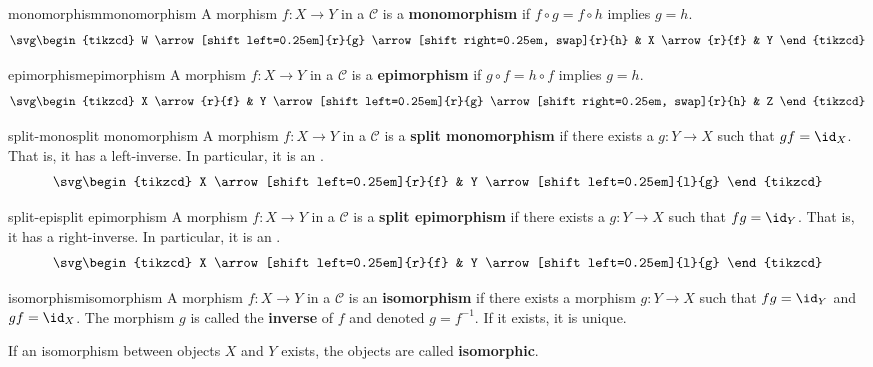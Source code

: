 \begin{topic}{monomorphism}{monomorphism}
    A morphism $f : X \to Y$ in a  $\mathcal{C}$ is a \textbf{monomorphism} if $f \circ g = f \circ h$ implies $g = h$.
    \[ \svg \begin{tikzcd} W \arrow[shift left=0.25em]{r}{g} \arrow[shift right=0.25em, swap]{r}{h} & X \arrow{r}{f} & Y \end{tikzcd} \]
\end{topic}

\begin{topic}{epimorphism}{epimorphism}
    A morphism $f : X \to Y$ in a  $\mathcal{C}$ is a \textbf{epimorphism} if $g \circ f = h \circ f$ implies $g = h$.
    \[ \svg \begin{tikzcd} X \arrow{r}{f} & Y \arrow[shift left=0.25em]{r}{g} \arrow[shift right=0.25em, swap]{r}{h} & Z \end{tikzcd} \]
\end{topic}

\begin{topic}{split-mono}{split monomorphism}
    A morphism $f : X \to Y$ in a  $\mathcal{C}$ is a \textbf{split monomorphism} if there exists a $g : Y \to X$ such that $gf = \id_X$. That is, it has a left-inverse. In particular, it is an .
    \[ \svg \begin{tikzcd} X \arrow[shift left=0.25em]{r}{f} & Y \arrow[shift left=0.25em]{l}{g} \end{tikzcd} \]
\end{topic}

\begin{topic}{split-epi}{split epimorphism}
    A morphism $f : X \to Y$ in a  $\mathcal{C}$ is a \textbf{split epimorphism} if there exists a $g : Y \to X$ such that $fg = \id_Y$. That is, it has a right-inverse. In particular, it is an .
    \[ \svg \begin{tikzcd} X \arrow[shift left=0.25em]{r}{f} & Y \arrow[shift left=0.25em]{l}{g} \end{tikzcd} \]
\end{topic}

\begin{topic}{isomorphism}{isomorphism}
    A morphism $f : X \to Y$ in a  $\mathcal{C}$ is an \textbf{isomorphism} if there exists a morphism $g : Y \to X$ such that $fg = \id_Y$ and $gf = \id_X$. The morphism $g$ is called the \textbf{inverse} of $f$ and denoted $g = f^{-1}$. If it exists, it is unique.
    
    If an isomorphism between objects $X$ and $Y$ exists, the objects are called \textbf{isomorphic}.
\end{topic}

